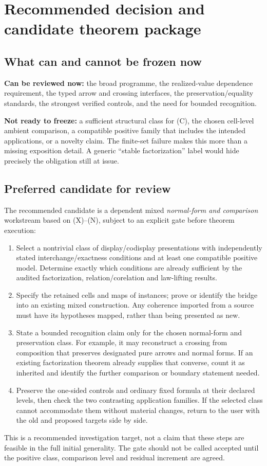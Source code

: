\documentclass[11pt,a4paper]{article}
\begin{document}
\section{Recommended decision and candidate theorem package}

\subsection{What can and cannot be frozen now}

\textbf{Can be reviewed now:} the broad programme, the realized-value dependence
requirement, the typed arrow and crossing interfaces, the preservation/equality
standards, the strongest verified controls, and the need for bounded recognition.

\textbf{Not ready to freeze:} a sufficient structural class for (C), the chosen cell-level
ambient comparison, a compatible positive family that includes
the intended applications, or a novelty claim. The finite-set failure makes this
more than a missing exposition detail. A generic ``stable factorization'' label
would hide precisely the obligation still at issue.

\subsection{Preferred candidate for review}

The recommended candidate is a dependent mixed \emph{normal-form and comparison}
workstream based on (X)--(N), subject to an explicit gate before theorem execution:
\begin{enumerate}
\item Select a nontrivial class of display/codisplay presentations with independently
stated interchange/exactness conditions and at least one compatible positive
model. Determine exactly which conditions are already sufficient by the audited
factorization, relation/corelation and law-lifting results.
\item Specify the retained cells and maps of instances; prove or identify the
bridge into an existing mixed construction. Any coherence imported from a source
must have its hypotheses mapped, rather than being presented as new.
\item State a bounded recognition claim only for the chosen normal-form and
preservation class. For example, it may reconstruct a crossing from composition
that preserves designated pure arrows and normal forms. If an existing
factorization theorem already supplies that converse, count it as inherited and
identify the further comparison or boundary statement needed.
\item Preserve the one-sided controls and ordinary fixed formula at their declared
levels, then check the two contrasting application families. If the selected
class cannot accommodate them without material changes, return to the user
with the old and proposed targets side by side.
\end{enumerate}
This is a recommended investigation target, not a claim that these steps are
feasible in the full initial generality. The gate should not be called accepted
until the positive class, comparison level and residual increment are agreed.
\end{document}
